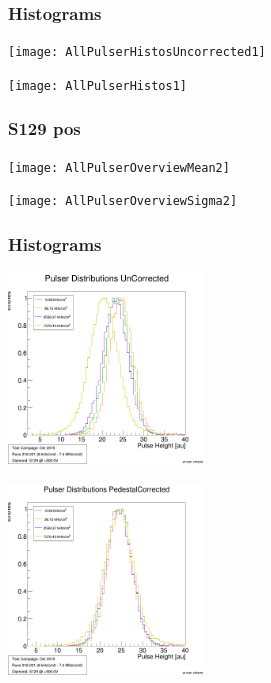 \documentclass[9pt]{beamer}
\begin{document}
\begin{frame}
	\frametitle{Histograms}
	\begin{center}
		\begin{minipage}{5.5cm}
			\centering
			\texttt{[image: AllPulserHistosUncorrected1]}\\
		\end{minipage}
		\begin{minipage}{5.5cm}
			\centering
			\texttt{[image: AllPulserHistos1]}\\
		\end{minipage}
	\end{center}
\end{frame}
\begin{frame}
	\frametitle{S129 pos}
	\begin{center}
		\texttt{[image: AllPulserOverviewMean2]}
	\end{center}
\end{frame}
\begin{frame}
	\begin{center}
		\texttt{[image: AllPulserOverviewSigma2]}
	\end{center}
\end{frame}
\begin{frame}
	\frametitle{Histograms}
	\begin{center}
		\begin{minipage}{5.5cm}
			\centering
			\includegraphics[width=5.2cm]{AllPulserHistosUncorrected2}\\
		\end{minipage}
		\begin{minipage}{5.5cm}
			\centering
			\includegraphics[width=5.2cm]{AllPulserHistos2}\\
		\end{minipage}
	\end{center}
\end{frame}
\end{document}
